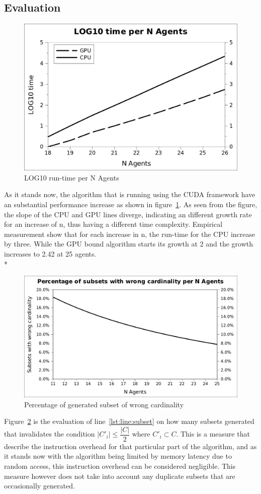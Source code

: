 \documentclass[a4paper, 12pt]{report}
\begin{document}
\subsection{Evaluation}

\begin{figure}[htb]
\centering
\includegraphics[width=0.7\linewidth]{loggraph.jpg}
\caption{LOG10 run-time per N Agents\label{log}}
\end{figure}


As it stands now, the algorithm that is running using the CUDA framework have an substantial performance increase as shown in figure~\ref{log}.
As seen from the figure, the slope of the CPU and GPU lines diverge, indicating an different growth rate for an increase of n, thus having a different time complexity.
Empirical measurement show that for each increase in n, the run-time for the CPU increase by three.
While the GPU bound algorithm starts its growth at 2 and the growth increases to 2.42 at 25 agents. \\*
\begin{figure}[htp]
\centering
\includegraphics[width=0.7\linewidth]{subset.jpg}
\caption{Percentage of generated subset of wrong cardinality\label{overhead}}
\end{figure}
\linebreak
Figure~\ref{overhead} is the evaluation of line~\ref{lst:line:subset} on how many subsets generated 
that invalidates the condition $\vert C'_{i} \vert \leq \dfrac{\vert C\vert }{2}$ where $C'_i \subset C$. This is a measure that describe the instruction overhead for that particular part of the algorithm, 
and as it stands now with the algorithm being limited by memory latency due to random access, this instruction overhead can be considered negligible.
This measure however does not take into account any duplicate subsets that are occasionally generated.
\end{document}
